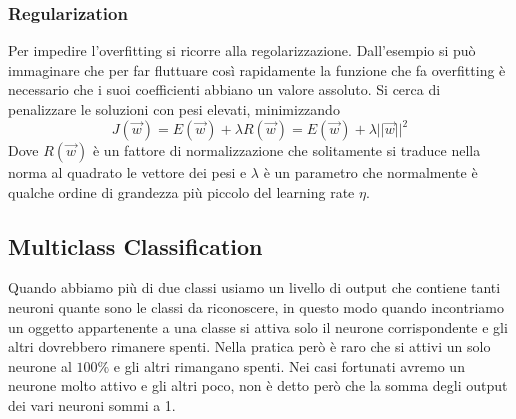 \subsubsection{Regularization}\label{sec:regularization}
Per impedire l'overfitting si ricorre alla regolarizzazione. Dall'esempio si può immaginare che per far fluttuare così rapidamente la funzione che fa overfitting è necessario che i suoi coefficienti abbiano un  valore assoluto. Si cerca di penalizzare le soluzioni con pesi elevati, minimizzando 
\begin{equation}
	J(\vec{w})= E(\vec{w}) + \lambda R(\vec{w}) = E(\vec{w}) + \lambda ||\vec{w}|| ^2
\end{equation}
Dove $R(\vec{w})$ è un fattore di normalizzazione che solitamente si traduce nella norma al quadrato le vettore dei pesi e $\lambda$ è un parametro che normalmente è qualche ordine di grandezza più piccolo del learning rate $\eta$.

\subsection{Multiclass Classification}
Quando abbiamo più di due classi usiamo un livello di output che contiene tanti neuroni quante sono le classi da riconoscere, in questo modo quando incontriamo un oggetto appartenente a una classe si attiva solo il neurone corrispondente e gli altri dovrebbero rimanere spenti. Nella pratica però è raro che si attivi un solo neurone al $100\%$ e gli altri rimangano spenti. Nei casi fortunati avremo un neurone molto attivo e gli altri poco, non è detto però che la somma degli output dei vari neuroni sommi a 1.
\newpage
